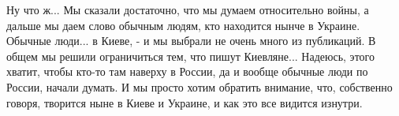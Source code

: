 Ну что ж... Мы сказали достаточно, что мы думаем относительно войны, а дальше
мы даем слово обычным людям, кто находится нынче в Украине. Обычные люди... в
Киеве, - и мы выбрали не очень много из публикаций. В общем мы решили
ограничиться тем, что пишут Киевляне... Надеюсь, этого хватит, чтобы кто-то там
наверху в России, да и вообще обычные люди по России, начали думать. И мы
просто хотим обратить внимание, что, собственно говоря, творится ныне в Киеве и
Украине, и как это все видится изнутри.
